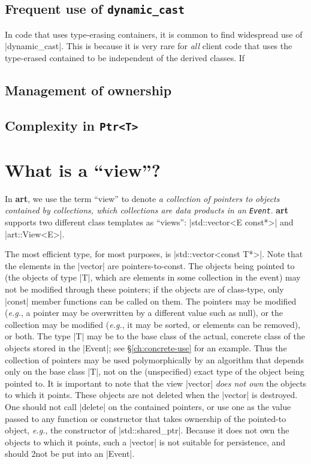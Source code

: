 \documentclass[letterpaper,10pt,article]{memoir}
\newcommand{\product}[1]{\textbf{#1}\xspace}
\newcommand{\art}{\product{art}}
\begin{document}
\section{Frequent use of \lstinline{dynamic_cast}}

In code that uses type-erasing containers, it is common to find
widespread use of |dynamic_cast|. This is because it is very rare for
\emph{all} client code that uses the type-erased contained to be
independent of the derived classes. If


\section{Management of ownership}
\section{Complexity in \lstinline{Ptr<T>}}

\chapter{What is a ``view''?}

In \art, we use the term ``view'' to denote \emph{a collection of
  pointers to objects contained by collections, which collections are
  data products in an \lstinline{Event}}.  \art supports two different
class templates as ``views'': |std::vector<E const*>| and
|art::View<E>|.

The most efficient type, for most purposes, %
is |std::vector<const T*>|. Note that the elements in the |vector| are
pointers-to-const. The objects being pointed to (the objects of type
|T|, which are elements in some collection in the event) may not be
modified through these pointers; if the objects are of class-type,
only |const| member functions can be called on them. The pointers may
be modified (\textit{e.g.}, a pointer may be overwritten by a
different value such as null), or the collection may be modified
(\textit{e.g.}, it may be sorted, or elements can be removed), or
both. The type |T| may be to the base class of the actual, concrete
class of the objects stored in the |Event|; see
\S\ref{ch:concrete-use} for an example. Thus the collection of
pointers may be used polymorphically by an algorithm that depends only
on the base class |T|, not on the (unspecified) exact type of the
object being pointed to. It is important to note that the view
|vector| \emph{does not own} the objects to which it points. These
objects are not deleted when the |vector| is destroyed. One should not
call |delete| on the contained pointers, or use one as the value
passed to any function or constructor that takes ownership of the
pointed-to object, \textit{e.g.}, the constructor of
|std::shared_ptr|. Because it does not own the objects to which it
points, such a |vector| is not suitable for persistence, and should
2not be put into an |Event|.
\end{document}

